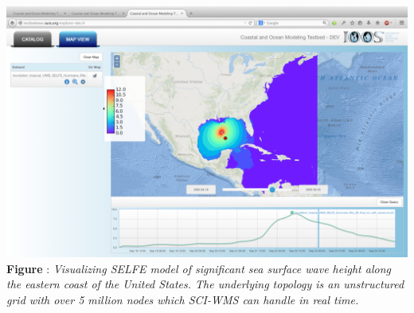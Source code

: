 \documentclass[noback,noborder,portrait,twocolumn]{cuposter}
\begin{document}
\figspace{}
\begin{minipage}[t]{\linewidth}
  \centering
  \includegraphics[width=\linewidth]{../figs/inundation_tropical_VIMS_SELFE_hurricane_rita_2d_final_run_with_waves_sea_surface_wave_significant_height}
  \textbf{Figure \getIncFigcounter{}}: \textit{Visualizing SELFE model of significant sea surface wave height along the eastern coast of the United States. The underlying topology is an unstructured grid with over 5 million nodes which SCI-WMS can handle in real time.}
\end{minipage}
\end{document}
